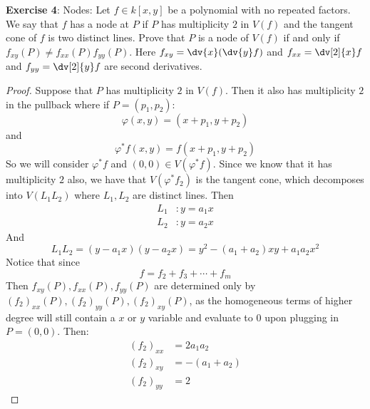 \documentclass{article}
\begin{document}
\textbf{Exercise 4}: Nodes: Let $f \in k[x, y]$ be a polynomial with no repeated factors. We say that $f$ has a node at $P$ if $P$ has multiplicity $2$ in $V(f)$ and the tangent cone of $f$ is two distinct lines. Prove that $P$ is a node of $V(f)$ if and only if $f_{xy}(P) \neq f_{xx}(P)f_{yy}(P)$. Here $f_{xy} = \dv{x}(\dv{y}f)$ and $f_{xx} = \dv[2]{x}f$ and $f_{yy} = \dv[2]{y}f$ are second derivatives.
    \begin{proof}
        Suppose that $P$ has multiplicity $2$ in $V(f)$. Then it also has multiplicity $2$ in the pullback where if $P = (p_{1}, p_{2})$:
            \begin{equation*}
                \varphi(x, y) = (x + p_{1}, y + p_{2})
            \end{equation*}
        and
            \begin{equation*}
                \varphi^{*}f(x, y) = f(x + p_{1}, y + p_{2})
            \end{equation*}
        So we will consider $\varphi^{*}f$ and $(0, 0) \in V(\varphi^{*}f)$. Since we know that it has multiplicity $2$ also, we have that $V(\varphi^{*}f_{2})$ is the tangent cone, which decomposes into $V(L_{1}L_{2})$ where $L_{1}, L_{2}$ are distinct lines. Then
            \begin{align*}
                L_{1} &: y = a_{1}x \\
                L_{2} &: y = a_{2}x   
            \end{align*}
        And
            \begin{equation*}
                L_{1}L_{2} = (y - a_{1}x)(y - a_{2}x) = y^{2} - (a_{1} + a_{2})xy  + a_{1}a_{2}x^{2}
            \end{equation*}
        Notice that since
            \begin{equation*}
                f = f_{2} + f_{3} + \cdots+f_{m}
            \end{equation*}
        Then $f_{xy}(P), f_{xx}(P), f_{yy}(P)$ are determined only by $(f_{2})_{xx}(P), (f_{2})_{yy}(P), (f_{2})_{xy}(P)$, as the homogeneous terms of higher degree will still contain a $x$ or $y$ variable and evaluate to $0$ upon plugging in $P = (0, 0)$. Then:
            \begin{align*}
                (f_{2})_{xx} &= 2a_{1}a_{2}      \\
                (f_{2})_{xy} &= -(a_{1} + a_{2}) \\
                (f_{2})_{yy} &= 2                  
            \end{align*}

\end{proof}
\end{document}
